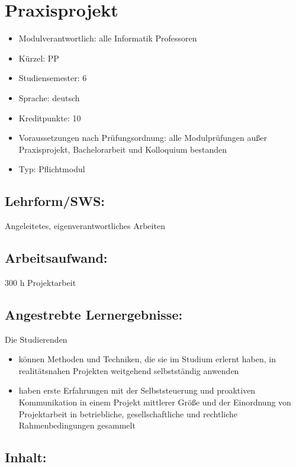 \chapter{Praxisprojekt}\label{praxisprojekt}

\begin{itemize}
\tightlist
\item
  Modulverantwortlich: alle Informatik Professoren
\item
  Kürzel: PP
\item
  Studiensemester: 6
\item
  Sprache: deutsch
\item
  Kreditpunkte: 10
\item
  Voraussetzungen nach Prüfungsordnung: alle Modulprüfungen außer
  Praxisprojekt, Bachelorarbeit und Kolloquium bestanden
\item
  Typ: Pflichtmodul
\end{itemize}

\section*{Lehrform/SWS:}\label{lehrformsws-18}

Angeleitetes, eigenverantwortliches Arbeiten

\section*{Arbeitsaufwand:}\label{arbeitsaufwand-17}

300 h Projektarbeit

\section*{Angestrebte
Lernergebnisse:}\label{angestrebte-lernergebnisse-18}

Die Studierenden

\begin{itemize}
\tightlist
\item
  können Methoden und Techniken, die sie im Studium erlernt haben, in
  realitätsnahen Projekten weitgehend selbstständig anwenden
\item
  haben erste Erfahrungen mit der Selbststeuerung und proaktiven
  Kommunikation in einem Projekt mittlerer Größe und der Einordnung von
  Projektarbeit in betriebliche, gesellschaftliche und rechtliche
  Rahmenbedingungen gesammelt
\end{itemize}

\section*{Inhalt:}\label{inhalt-18}

